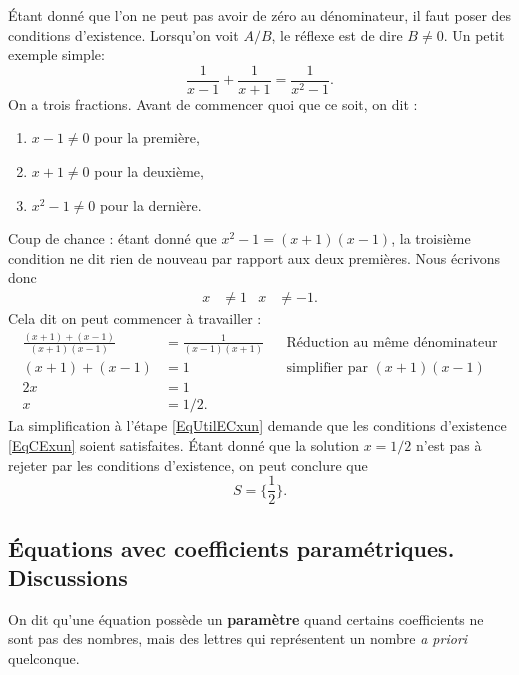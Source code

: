 \documentclass[a4paper,12pt]{book}
\theoremstyle{mes_exemples}	\newtheorem{exemple}[numtho]{Exemple}
\theoremstyle{mes_tho}
\newcommand{\defe}[2]{\textbf{#1}\index{#2}}
\begin{document}
Étant donné que l'on ne peut pas avoir de zéro au dénominateur, il faut poser des conditions d'existence. Lorsqu'on voit $A/B$, le réflexe est de dire $B\neq 0$. Un petit exemple \og simple\fg :
\begin{equation} 
  \frac{1}{ x-1 }+\frac{1}{ x+1 }=\frac{1}{ x^{2}-1 }.
\end{equation}
On a trois fractions. Avant de commencer quoi que ce soit, on dit :
\begin{enumerate}
\item $x-1\neq 0$ pour la première,
\item $x+1\neq 0$ pour la deuxième,
\item $x^{2}-1\neq 0$ pour la dernière.
\end{enumerate}
Coup de chance : étant donné que $x^{2}-1=(x+1)(x-1)$, la troisième condition ne dit rien de nouveau par rapport aux deux premières. Nous écrivons donc
\begin{align} \label{EqCExun}
    x&\neq 1& x&\neq-1.
\end{align}
Cela dit on peut commencer à travailler :
\begin{subequations}
\begin{align} 
 \frac{ (x+1)+(x-1) }{ (x+1)(x-1) }&=\frac{1}{ (x-1)(x+1) }&&\text{Réduction au même dénominateur}\\
(x+1)+(x-1)&=1&&\text{simplifier par $(x+1)(x-1)$ } \label{EqUtilECxun}\\
2x&=1\\
x&=1/2.
\end{align}
\end{subequations}
La simplification à l'étape \eqref{EqUtilECxun} demande que les conditions d'existence \eqref{EqCExun} soient satisfaites. Étant donné que la solution $x=1/2$ n'est pas à rejeter par les conditions d'existence, on peut conclure que
\begin{equation}
  S=\{ \frac{ 1 }{ 2 } \}.
\end{equation}

\subsection{Équations avec coefficients paramétriques. Discussions}

On dit qu'une équation possède un \defe{paramètre}{} quand certains coefficients ne sont pas des nombres, mais des lettres qui représentent un nombre \emph{a priori} quelconque.
\end{document}
